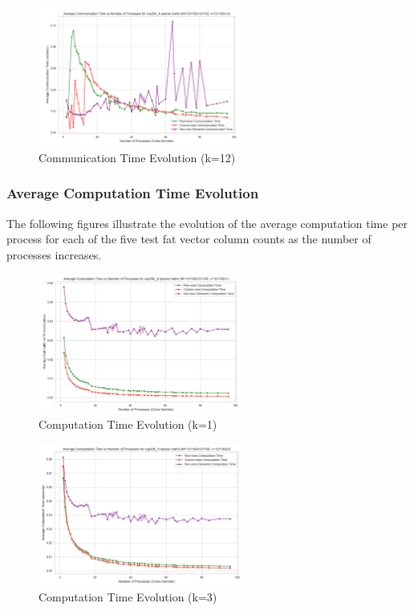 \documentclass[12pt,oneside]{book} %
\begin{document}
\begin{figure}[H]
    \centering
    \includegraphics[width=0.6\textwidth]{../results/fat_vector_dim/cop20k_A_k12_communication_time.png}
    \caption{Communication Time Evolution (k=12)}\label{fig:cop20k-a-k12-communication-time}
\end{figure}

\subsubsection{Average Computation Time Evolution}

The following figures illustrate the evolution of the average computation time
per process for each of the five test fat vector column counts as the number of
processes increases.

\begin{figure}[H]
    \centering
    \includegraphics[width=0.6\textwidth]{../results/fat_vector_dim/cop20k_A_k1_computation_time.png}
    \caption{Computation Time Evolution (k=1)}\label{fig:cop20k-a-k1-computation-time}
\end{figure}

\begin{figure}[H]
    \centering
    \includegraphics[width=0.6\textwidth]{../results/fat_vector_dim/cop20k_A_k3_computation_time.png}
    \caption{Computation Time Evolution (k=3)}\label{fig:cop20k-a-k3-computation-time}
\end{figure}
\end{document}

